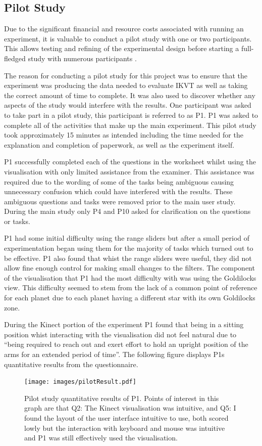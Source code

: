 \subsection{Pilot Study}
Due to the significant financial and resource costs associated with running an
experiment, it 
is valuable to conduct a pilot study with one or two 
participants. This allows testing and refining of the experimental
design before starting a full-fledged study with numerous 
participants \cite{kosara2003thoughts}. 

The reason for conducting a pilot study for this project was to ensure that
the experiment was producing the data needed to evaluate IKVT as well
as taking the correct amount of time to complete. It was also
used to discover whether any aspects of the study would
interfere with the results. One participant was asked to take part in a pilot
study, this participant is referred to as P1. P1 was asked to complete all of
the activities that
make up the main experiment. This pilot study took approximately 15 minutes as
intended including the time needed for the explanation and completion of
paperwork, as well as the experiment itself.

P1 successfully completed each of the questions in the worksheet whilst using
the visualisation with only
limited assistance from the examiner. This assistance was required due to the
wording of
some of the tasks being ambiguous causing
unnecessary confusion which could have interfered with the results. These
ambiguous questions and
tasks were removed prior to the main user study. During the main study only P4
and P10 asked for clarification on the questions or tasks.

P1 had some initial difficulty using the range sliders but after a small period
of experimentation began using them for the majority of tasks which turned out
to be effective. P1 also found that whist the range sliders were useful,
they did not allow fine enough control for making small changes to the filters.
The component
of the visualisation that P1 had the most difficulty with was using the
Goldilocks
view. This difficulty seemed to stem from the lack of a common point of
reference for each planet due to each planet having a different star with its
own Goldilocks zone.

During the Kinect portion of the experiment P1 found that being in a sitting
position whist interacting with the visualisation did not feel natural due to
``being required to reach out and exert effort to hold an upright position of
the arms for an extended period of time''. The following figure displays P1s
quantitative results from the questionnaire.
\clearpage
\begin{figure}[H]
  \centering
      \texttt{[image: images/pilotResult.pdf]}
  \caption[Pilot study results]{Pilot study quantitative results of P1. Points
of interest in this graph are that Q2: The Kinect visualisation was intuitive,
and Q5: I found the layout of the user interface intuitive to use, both scored
lowly but the interaction with keyboard and mouse was intuitive and P1 was still
effectively used the visualisation.}  
    \label{fig:pilot}
\end{figure}


